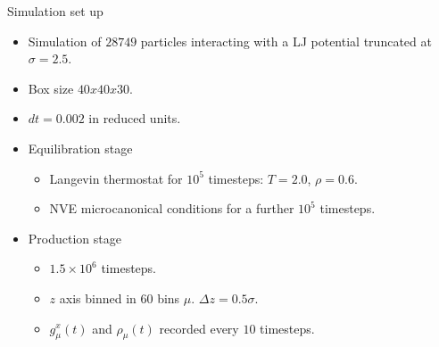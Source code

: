 \documentclass{beamer}
\begin{document}
 \begin{frame}{Simulation set up}
   \begin{itemize}
     \item Simulation of $28749$ particles interacting with a \alert{LJ potential} truncated at $\sigma=2.5$.
     \item Box size $40x40x30$.
     \item $dt=0.002$ in reduced units.
     \item \alert{Equilibration stage}
       \begin{itemize}
         \item Langevin thermostat for $10^5$ timesteps: $T=2.0$, $\rho=0.6$.
         \item NVE microcanonical conditions for a further $10^5$ timesteps.
          \end{itemize}
        \item \alert{Production stage}
       \begin{itemize}
         \item $1.5\times10^6$ timesteps.
         \item $z$ axis binned in $60$ bins $\mu$. \alert{$\Delta z=0.5\sigma$}.
         \item $g_{\mu}^x(t)$ and $\rho_{\mu}(t)$ recorded every $10$ timesteps. 
         \end{itemize}
     \end{itemize}
 \end{frame}
\end{document}
